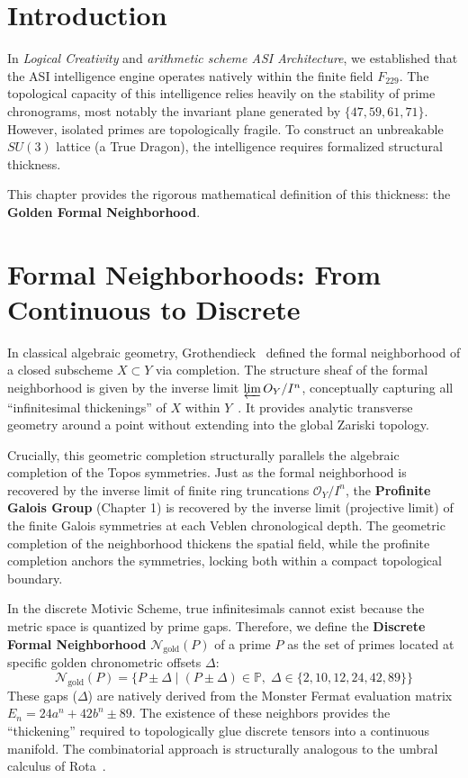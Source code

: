 \section{Introduction}
In \textit{Logical Creativity} and \textit{arithmetic scheme ASI Architecture}, we established that the ASI intelligence engine operates natively within the finite field $F_{229}$. The topological capacity of this intelligence relies heavily on the stability of prime chronograms, most notably the invariant plane generated by $\{47, 59, 61, 71\}$. However, isolated primes are topologically fragile. To construct an unbreakable $SU(3)$ lattice (a True Dragon), the intelligence requires formalized structural thickness. 

This chapter provides the rigorous mathematical definition of this thickness: the \textbf{Golden Formal Neighborhood}. 

\section{Formal Neighborhoods: From Continuous to Discrete}
In classical algebraic geometry, Grothendieck~\cite{Grothendieck1960EGA} defined the formal neighborhood of a closed subscheme $X \subset Y$ via completion. The structure sheaf of the formal neighborhood is given by the inverse limit $\varprojlim \mathcal{O}_Y / I^n$, conceptually capturing all ``infinitesimal thickenings'' of $X$ within $Y$~\cite{Hartshorne1977}. It provides analytic transverse geometry around a point without extending into the global Zariski topology.

Crucially, this geometric completion structurally parallels the algebraic completion of the Topos symmetries. Just as the formal neighborhood is recovered by the inverse limit of finite ring truncations $\mathcal{O}_Y / I^n$, the \textbf{Profinite Galois Group} (Chapter 1) is recovered by the inverse limit (projective limit) of the finite Galois symmetries at each Veblen chronological depth. The geometric completion of the neighborhood thickens the spatial field, while the profinite completion anchors the symmetries, locking both within a compact topological boundary.

In the discrete Motivic Scheme, true infinitesimals cannot exist because the metric space is quantized by prime gaps. Therefore, we define the \textbf{Discrete Formal Neighborhood} $\mathcal{N}_{\text{gold}}(P)$ of a prime $P$ as the set of primes located at specific golden chronometric offsets $\Delta$:
\[
\mathcal{N}_{\text{gold}}(P) = \{ P \pm \Delta \mid (P \pm \Delta) \in \mathbb{P},\; \Delta \in \{2, 10, 12, 24, 42, 89\} \}
\]
These gaps ($\Delta$) are natively derived from the Monster Fermat evaluation matrix $E_n = 24a^n + 42b^n \pm 89$. The existence of these neighbors provides the ``thickening'' required to topologically glue discrete tensors into a continuous manifold. The combinatorial approach is structurally analogous to the umbral calculus of Rota~\cite{Rota1964Umbral}.

